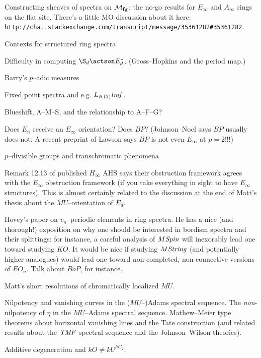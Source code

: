 Constructing sheaves of spectra on $\mathcal{M}_{\mathbf{fg}}$: the no-go results for $E_\infty$ and $A_\infty$ rings on the flat site.  There's a little MO discussion about it here: \texttt{http://chat.stackexchange.com/transcript/message/35361282\#35361282}.

Contexts for structured ring spectra

Difficulty in computing $\S_d \actson E_d^*$. (Gross--Hopkins and the period map.)

Barry's $p$--adic measures

Fixed point spectra and e.g. $L_{K(2)} \mathit{tmf}$.

Blueshift, A--M--S, and the relationship to A--F--G?

Does $E_n$ receive an $E_\infty$ orientation?  Does $BP$?  (Johnson--Noel says $BP$ usually does not.  A recent preprint of Lawson says $BP$ is not even $E_\infty$ at $p = 2$!!!)

$p$--divisible groups and transchromatic phenomena

Remark 12.13 of published $H_\infty$ AHS says their obstruction framework agrees with the $E_\infty$ obstruction framework (if you take everything in sight to have $E_\infty$ structures).  This is almost certainly related to the discussion at the end of Matt's thesis about the $MU$--orientation of $E_d$.

Hovey's paper on $v_n$--periodic elements in ring spectra.  He has a nice (and thorough!) exposition on why one should be interested in bordism spectra and their splittings: for instance, a careful analysis of $M\mathit{Spin}$ will inexorably lead one toward studying $KO$.  It would be nice if studying $M\mathit{String}$ (and potentially higher analogues) would lead one toward non-completed, non-connective versions of $EO_n$.  Talk about $BoP$, for instance.

Matt's short resolutions of chromatically localized $MU$.

Nilpotency and vanishing curves in the ($MU$--)Adams spectral sequence.  The \emph{non}-nilpotency of $\eta$ in the $MU$--Adams spectral sequence.  Mathew--Meier type theorems about horizontal vanishing lines and the Tate construction (and related results about the $\mathit{TMF}$ spectral sequence and the Johnson--Wilson theories).

Additive degeneration and $kO \ne kU^{hC_2}$.






